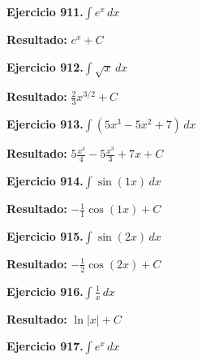 \documentclass[10pt,a4paper]{article}
\begin{document}
\begin{ejbox}
\textbf{Ejercicio 911.}\quad $\int e^x\,dx$
\end{ejbox}

\begin{solbox}
\textbf{Resultado:} \(\displaystyle e^x + C\)
\end{solbox}

\begin{ejbox}
\textbf{Ejercicio 912.}\quad $\int \sqrt{x}\,dx$
\end{ejbox}

\begin{solbox}
\textbf{Resultado:} \(\displaystyle \frac{2}{3}x^{3/2} + C\)
\end{solbox}

\newpage
\begin{ejbox}
\textbf{Ejercicio 913.}\quad $\int (5x^3 -5x^2 +7)\,dx$
\end{ejbox}

\begin{solbox}
\textbf{Resultado:} \(\displaystyle 5\frac{x^4}{4} -5\frac{x^3}{3} +7x + C\)
\end{solbox}

\begin{ejbox}
\textbf{Ejercicio 914.}\quad $\int \sin(1x)\,dx$
\end{ejbox}

\begin{solbox}
\textbf{Resultado:} \(\displaystyle -\frac{1}{1}\cos(1x) + C\)
\end{solbox}

\begin{ejbox}
\textbf{Ejercicio 915.}\quad $\int \sin(2x)\,dx$
\end{ejbox}

\begin{solbox}
\textbf{Resultado:} \(\displaystyle -\frac{1}{2}\cos(2x) + C\)
\end{solbox}

\newpage
\begin{ejbox}
\textbf{Ejercicio 916.}\quad $\int \frac{1}{x}\,dx$
\end{ejbox}

\begin{solbox}
\textbf{Resultado:} \(\displaystyle \ln|x| + C\)
\end{solbox}

\begin{ejbox}
\textbf{Ejercicio 917.}\quad $\int e^x\,dx$
\end{ejbox}
\end{document}

